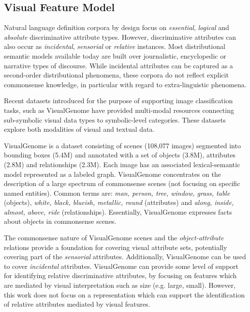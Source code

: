 \documentclass[11pt,a4paper]{article}
\begin{document}
\subsection{Visual Feature Model}

Natural language definition corpora by design focus on \textit{essential}, \textit{logical} and \textit{absolute} discriminative attribute types. However, discriminative attributes can also occur as \textit{incidental}, \textit{sensorial} or \textit{relative} instances. Most distributional semantic models available today are built over journalistic, encyclopedic or narrative types of discourse. While incidental attributes can be captured as a second-order distributional phenomena, these corpora do not reflect explicit commonsense knowledge, in particular with regard to extra-linguistic phenomena. 

Recent datasets introduced for the purpose of supporting image classification tasks, such as VisualGenome \cite{krishna2017visual} have provided multi-modal resources connecting sub-symbolic visual data types to symbolic-level categories. These datasets explore both modalities of visual and textual data. 

VisualGenome is a dataset consisting of scenes (108,077 images) segmented into bounding boxes (5.4M) and annotated with a set of objects (3.8M), attributes (2.8M) and relationships (2.3M). Each image has an associated lexical-semantic model represented as a labeled graph. VisualGenome concentrates on the description of a large spectrum of commonsense scenes (not focusing on specific named entities). Common terms are: \emph{man, person, tree, window, grass, table} (objects), \emph{white, black, blueish, metallic, round} (attributes) and \emph{along, inside, almost, above, ride} (relationships). Essentially, VisualGenome expresses facts about objects in commonsense scenes.

The commonsense nature of VisualGenome scenes and the \emph{object-attribute} relations provide a foundation for covering visual attribute sets, potentially covering part of the \emph{sensorial} attributes. Additionally, VisualGenome can be used to cover \emph{incidental} attributes. VisualGenome can provide some level of support for identifying relative discriminative attributes, by focusing on features which are mediated by visual interpretation such as size (e.g. large, small). However, this work does not focus on a representation which can support the identification of relative attributes mediated by visual features.
\end{document}
